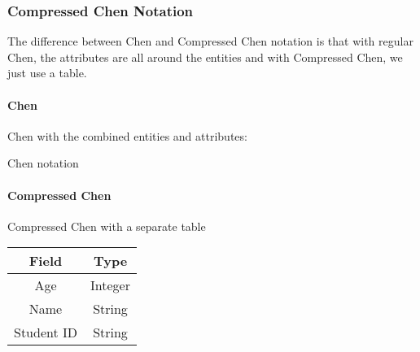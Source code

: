 \subsubsection{Compressed Chen Notation}\label{ssub:compressed_chen_notation}

The difference between Chen and Compressed Chen notation is that with regular Chen, the attributes are all around the entities and with Compressed Chen, we just use a table.

\paragraph{Chen}\label{par:chen}

Chen with the combined entities and attributes:

\begin{highlight}{Chen notation}
    \begin{center}
    \end{center}
\end{highlight}

\paragraph{Compressed Chen}\label{par:compressed_chen}

\begin{highlight}{Compressed Chen with a separate table}
    \begin{minipage}{0.57\linewidth}
        \centering
    \end{minipage}
    \hfill
    \begin{minipage}{0.40\linewidth}
        \centering
        \begin{tabular}{cc}
            \toprule
            Field      & Type    \\
            \midrule
            Age        & Integer \\
            Name       & String  \\
            Student ID & String  \\
            \bottomrule
        \end{tabular}
    \end{minipage}
\end{highlight}

